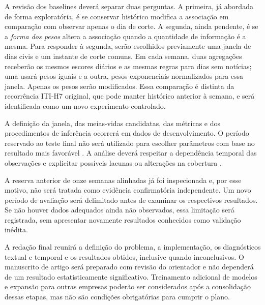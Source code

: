 A revisão dos baselines deverá separar duas perguntas. A primeira, já abordada de forma exploratória, é se conservar histórico modifica a associação em comparação com observar apenas o dia de corte. A segunda, ainda pendente, é se a \emph{forma dos pesos} altera a associação quando a quantidade de informação é a mesma. Para responder à segunda, serão escolhidos previamente uma janela de dias civis e um instante de corte comuns. Em cada semana, duas agregações receberão os mesmos escores diários e as mesmas regras para dias sem notícias; uma usará pesos iguais e a outra, pesos exponenciais normalizados para essa janela. Apenas os pesos serão modificados. Essa comparação é distinta da recorrência ITI-H7 original, que pode manter histórico anterior à semana, e será identificada como um novo experimento controlado.

A definição da janela, das meias-vidas candidatas, das métricas e dos procedimentos de inferência ocorrerá em dados de desenvolvimento. O período reservado ao teste final não será utilizado para escolher parâmetros com base no resultado mais favorável \cite{varma2006bias}. A análise deverá respeitar a dependência temporal das observações e explicitar possíveis lacunas ou alterações na cobertura \cite{roberts2017cross}.

A reserva anterior de onze semanas alinhadas já foi inspecionada e, por esse motivo, não será tratada como evidência confirmatória independente. Um novo período de avaliação será delimitado antes de examinar os respectivos resultados. Se não houver dados adequados ainda não observados, essa limitação será registrada, sem apresentar novamente resultados conhecidos como validação inédita.

A redação final reunirá a definição do problema, a implementação, os diagnósticos textual e temporal e os resultados obtidos, inclusive quando inconclusivos. O manuscrito de artigo será preparado com revisão do orientador e não dependerá de um resultado estatisticamente significativo. Treinamento adicional de modelos e expansão para outras empresas poderão ser considerados após a consolidação dessas etapas, mas não são condições obrigatórias para cumprir o plano.
